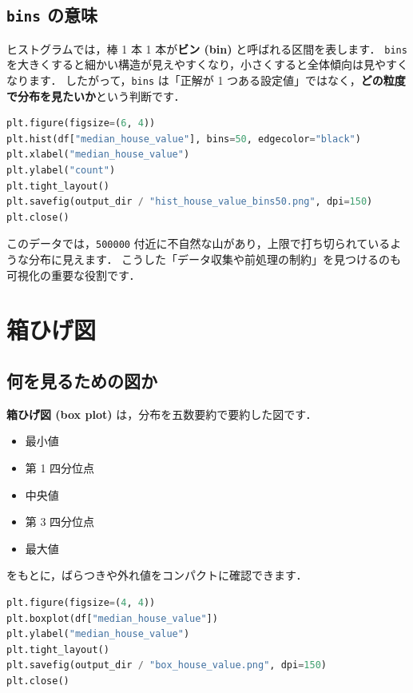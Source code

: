 
\subsection{\texttt{bins} の意味}

ヒストグラムでは，棒 1 本 1 本が\textbf{ビン (bin)} と呼ばれる区間を表します．
\texttt{bins} を大きくすると細かい構造が見えやすくなり，小さくすると全体傾向は見やすくなります．
したがって，\texttt{bins} は「正解が 1 つある設定値」ではなく，\textbf{どの粒度で分布を見たいか}という判断です．

\begin{lstlisting}[style=codecell,language=Python]
plt.figure(figsize=(6, 4))
plt.hist(df["median_house_value"], bins=50, edgecolor="black")
plt.xlabel("median_house_value")
plt.ylabel("count")
plt.tight_layout()
plt.savefig(output_dir / "hist_house_value_bins50.png", dpi=150)
plt.close()
\end{lstlisting}


このデータでは，\texttt{500000} 付近に不自然な山があり，上限で打ち切られているような分布に見えます．
こうした「データ収集や前処理の制約」を見つけるのも可視化の重要な役割です．


\section{箱ひげ図}

\subsection{何を見るための図か}

\textbf{箱ひげ図 (box plot)} は，分布を五数要約で要約した図です．
\begin{itemize}
\item 最小値
\item 第 1 四分位点
\item 中央値
\item 第 3 四分位点
\item 最大値
\end{itemize}
をもとに，ばらつきや外れ値をコンパクトに確認できます．

\begin{lstlisting}[style=codecell,language=Python]
plt.figure(figsize=(4, 4))
plt.boxplot(df["median_house_value"])
plt.ylabel("median_house_value")
plt.tight_layout()
plt.savefig(output_dir / "box_house_value.png", dpi=150)
plt.close()
\end{lstlisting}

